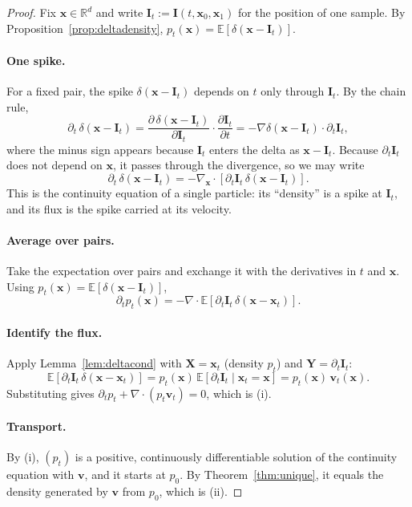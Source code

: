 \documentclass[11pt,a4paper]{article}
\numberwithin{equation}{section}     %
\theoremstyle{plain}        %
\theoremstyle{definition}   %
\theoremstyle{remark}       %
\begin{document}
\begin{proof}
Fix $\mathbf{x}\in\mathbb{R}^d$ and write $\mathbf{I}_t:=\mathbf{I}(t,\mathbf{x}_0,\mathbf{x}_1)$ for the position of one sample. By Proposition~\ref{prop:deltadensity}, $p_t(\mathbf{x})=\mathbb{E}[\delta(\mathbf{x}-\mathbf{I}_t)]$.

\paragraph{One spike.} For a fixed pair, the spike $\delta(\mathbf{x}-\mathbf{I}_t)$ depends on $t$ only through $\mathbf{I}_t$. By the chain rule,
\[
\partial_t\,\delta(\mathbf{x}-\mathbf{I}_t)=\frac{\partial\,\delta(\mathbf{x}-\mathbf{I}_t)}{\partial\mathbf{I}_t}\cdot\frac{\partial\mathbf{I}_t}{\partial t}=-\nabla\delta(\mathbf{x}-\mathbf{I}_t)\cdot\partial_t\mathbf{I}_t ,
\]
where the minus sign appears because $\mathbf{I}_t$ enters the delta as $\mathbf{x}-\mathbf{I}_t$. Because $\partial_t\mathbf{I}_t$ does not depend on $\mathbf{x}$, it passes through the divergence, so we may write
\[
\partial_t\,\delta(\mathbf{x}-\mathbf{I}_t)=-\nabla_{\mathbf{x}}\cdot\left[\partial_t\mathbf{I}_t\,\delta(\mathbf{x}-\mathbf{I}_t)\right].
\]
This is the continuity equation of a single particle: its ``density'' is a spike at $\mathbf{I}_t$, and its flux is the spike carried at its velocity.

\paragraph{Average over pairs.} Take the expectation over pairs and exchange it with the derivatives in $t$ and $\mathbf{x}$. Using $p_t(\mathbf{x})=\mathbb{E}[\delta(\mathbf{x}-\mathbf{I}_t)]$,
\[
\partial_t p_t(\mathbf{x})=-\nabla\cdot\mathbb{E}\left[\partial_t\mathbf{I}_t\,\delta(\mathbf{x}-\mathbf{x}_t)\right].
\]

\paragraph{Identify the flux.} Apply Lemma~\ref{lem:deltacond} with $\mathbf{X}=\mathbf{x}_t$ (density $p_t$) and $\mathbf{Y}=\partial_t\mathbf{I}_t$:
\[
\mathbb{E}\left[\partial_t\mathbf{I}_t\,\delta(\mathbf{x}-\mathbf{x}_t)\right]=p_t(\mathbf{x})\,\mathbb{E}\left[\partial_t\mathbf{I}_t\mid\mathbf{x}_t=\mathbf{x}\right]=p_t(\mathbf{x})\,\mathbf{v}_t(\mathbf{x}).
\]
Substituting gives $\partial_t p_t+\nabla\cdot(p_t\mathbf{v}_t)=0$, which is (i).

\paragraph{Transport.} By (i), $(p_t)$ is a positive, continuously differentiable solution of the continuity equation with $\mathbf{v}$, and it starts at $p_0$. By Theorem~\ref{thm:unique}, it equals the density generated by $\mathbf{v}$ from $p_0$, which is (ii).
\end{proof}
\end{document}
